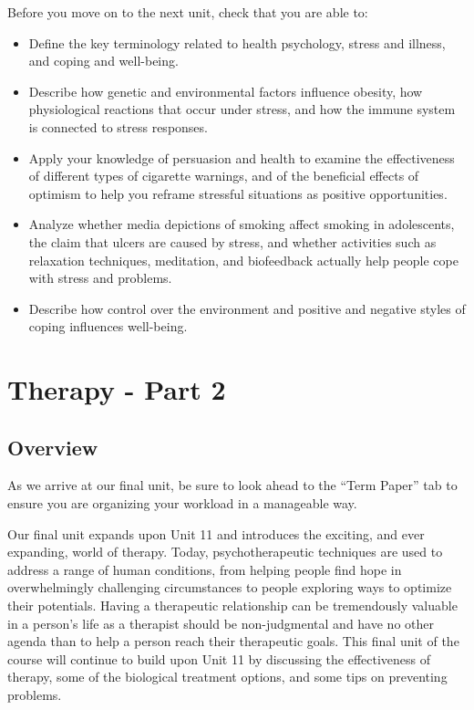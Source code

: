 \documentclass[
]{book}
\begin{document}
\begin{progress}
Before you move on to the next unit, check that you are able to:

\begin{itemize}
\item
  Define the key terminology related to health psychology, stress and illness, and coping and well-being.
\item
  Describe how genetic and environmental factors influence obesity, how physiological reactions that occur under stress, and how the immune system is connected to stress responses.
\item
  Apply your knowledge of persuasion and health to examine the effectiveness of different types of cigarette warnings, and of the beneficial effects of optimism to help you reframe stressful situations as positive opportunities.
\item
  Analyze whether media depictions of smoking affect smoking in adolescents, the claim that ulcers are caused by stress, and whether activities such as relaxation techniques, meditation, and biofeedback actually help people cope with stress and problems.
\item
  Describe how control over the environment and positive and negative styles of coping influences well-being.
\end{itemize}
\end{progress}

\hypertarget{therapy---part-2}{%
\chapter{Therapy - Part 2}\label{therapy---part-2}}

\hypertarget{overview-11}{%
\section*{Overview}\label{overview-11}}

As we arrive at our final unit, be sure to look ahead to the ``Term Paper'' tab to ensure you are organizing your workload in a manageable way.

Our final unit expands upon Unit 11 and introduces the exciting, and ever expanding, world of therapy. Today, psychotherapeutic techniques are used to address a range of human conditions, from helping people find hope in overwhelmingly challenging circumstances to people exploring ways to optimize their potentials. Having a therapeutic relationship can be tremendously valuable in a person's life as a therapist should be non-judgmental and have no other agenda than to help a person reach their therapeutic goals. This final unit of the course will continue to build upon Unit 11 by discussing the effectiveness of therapy, some of the biological treatment options, and some tips on preventing problems.
\end{document}
